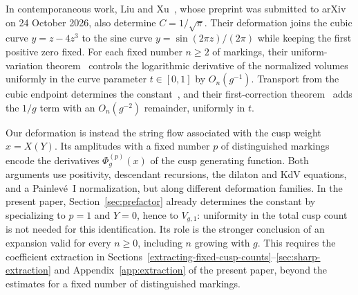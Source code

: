 In contemporaneous work, Liu and Xu~\cite{LXConstant}, whose preprint was submitted to arXiv on 24 October 2026, also determine $C=1/\sqrt\pi$. Their deformation joins the cubic curve $y=z-4z^3$ to the sine curve $y=\sin(2\pi z)/(2\pi)$ while keeping the first positive zero fixed. For each fixed number $n\ge2$ of markings, their uniform-variation theorem~\cite[Theorem~1.1]{LXConstant} controls the logarithmic derivative of the normalized volumes uniformly in the curve parameter $t\in[0,1]$ by $O_n(g^{-1})$. Transport from the cubic endpoint determines the constant~\cite[Corollary~1.2]{LXConstant}, and their first-correction theorem~\cite[Theorem~1.3]{LXConstant} adds the $1/g$ term with an $O_n(g^{-2})$ remainder, uniformly in $t$.

Our deformation is instead the string flow associated with the cusp weight $x=X(Y)$. Its amplitudes with a fixed number $p$ of distinguished markings encode the derivatives $\Phi_g^{(p)}(x)$ of the cusp generating function. Both arguments use positivity, descendant recursions, the dilaton and KdV equations, and a Painlev\'e~I normalization, but along different deformation families. In the present paper, Section~\ref{sec:prefactor} already determines the constant by specializing to $p=1$ and $Y=0$, hence to $V_{g,1}$: uniformity in the total cusp count is not needed for this identification. Its role is the stronger conclusion of an expansion valid for every $n\ge0$, including $n$ growing with $g$. This requires the coefficient extraction in Sections~\ref{extracting-fixed-cusp-counts}--\ref{sec:sharp-extraction} and Appendix~\ref{app:extraction} of the present paper, beyond the estimates for a fixed number of distinguished markings.

